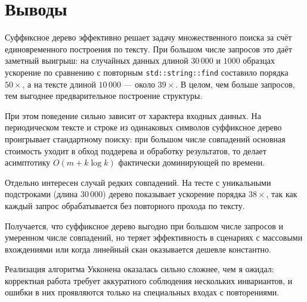 \section{Выводы}

Суффиксное дерево эффективно решает задачу множественного поиска за счёт
единовременного построения по тексту. При большом числе запросов это даёт
заметный выигрыш: на случайных данных длиной $30\,000$ и $1000$ образцах
ускорение по сравнению с повторным \texttt{std::string::find} составило
порядка $50\times$, а на тексте длиной $10\,000$ — около $39\times$.
В целом, чем больше запросов, тем выгоднее предварительное построение структуры.

При этом поведение сильно зависит от характера входных данных.
На периодическом тексте и строке из одинаковых символов суффиксное
дерево проигрывает стандартному поиску: при большом числе совпадений
основная стоимость уходит в обход поддерева и обработку результатов,
то делает асимптотику $O(m + k \log k)$ фактически доминирующей по времени.

Отдельно интересен случай редких совпадений. На тесте с уникальными
подстроками (длина $30\,000$) дерево показывает ускорение порядка $38\times$,
так как каждый запрос обрабатывается без повторного прохода по тексту.

Получается, что суффиксное дерево выгодно при большом числе запросов
и умеренном числе совпадений, но теряет эффективность в сценариях с массовыми
вхождениями или когда линейный скан оказывается дешевле константно.

Реализация алгоритма Укконена оказалась сильно сложнее, чем я ожидал:
корректная работа требует аккуратного соблюдения нескольких инвариантов,
и ошибки в них проявляются только на специальных входах с повторениями.
\pagebreak